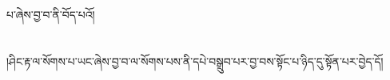པ་ཞེས་བྱ་བ་ནི་བོད་པའོ།\chapter{ }།ཤིང་རྟ་ལ་སོགས་པ་ཡང་ཞེས་བྱ་བ་ལ་སོགས་པས་ནི་དཔེ་བསྒྲུབ་པར་བྱ་བས་སྟོང་པ་ཉིད་དུ་སྟོན་པར་བྱེད་དོ།\chapter{ }